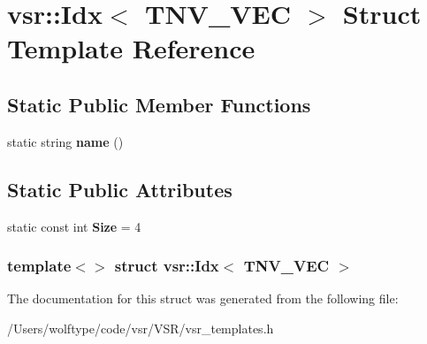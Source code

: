 \hypertarget{structvsr_1_1_idx_3_01_t_n_v___v_e_c_01_4}{\section{vsr\-:\-:Idx$<$ T\-N\-V\-\_\-\-V\-E\-C $>$ Struct Template Reference}
\label{structvsr_1_1_idx_3_01_t_n_v___v_e_c_01_4}
}
\subsection*{Static Public Member Functions}
\begin{DoxyCompactItemize}
\item 
\hypertarget{structvsr_1_1_idx_3_01_t_n_v___v_e_c_01_4_a2817a5eee27ce402bf0c4b735ff6cbcd}{static string {\bfseries name} ()}\label{structvsr_1_1_idx_3_01_t_n_v___v_e_c_01_4_a2817a5eee27ce402bf0c4b735ff6cbcd}

\end{DoxyCompactItemize}
\subsection*{Static Public Attributes}
\begin{DoxyCompactItemize}
\item 
\hypertarget{structvsr_1_1_idx_3_01_t_n_v___v_e_c_01_4_a62f7a576bcaaffbf9f84ac9d3c79582a}{static const int {\bfseries Size} = 4}\label{structvsr_1_1_idx_3_01_t_n_v___v_e_c_01_4_a62f7a576bcaaffbf9f84ac9d3c79582a}

\end{DoxyCompactItemize}
\subsubsection*{template$<$$>$ struct vsr\-::\-Idx$<$ T\-N\-V\-\_\-\-V\-E\-C $>$}



The documentation for this struct was generated from the following file\-:\begin{DoxyCompactItemize}
\item 
/\-Users/wolftype/code/vsr/\-V\-S\-R/vsr\-\_\-templates.\-h\end{DoxyCompactItemize}
